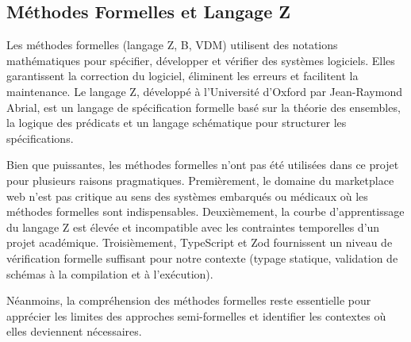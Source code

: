 \subsection{Méthodes Formelles et Langage Z}



Les méthodes formelles (langage Z, B, VDM) utilisent des notations mathématiques pour spécifier, développer et vérifier des systèmes logiciels. Elles garantissent la correction du logiciel, éliminent les erreurs et facilitent la maintenance. Le langage Z, développé à l'Université d'Oxford par Jean-Raymond Abrial, est un langage de spécification formelle basé sur la théorie des ensembles, la logique des prédicats et un langage schématique pour structurer les spécifications.



Bien que puissantes, les méthodes formelles n'ont pas été utilisées dans ce projet pour plusieurs raisons pragmatiques. Premièrement, le domaine du marketplace web n'est pas critique au sens des systèmes embarqués ou médicaux où les méthodes formelles sont indispensables. Deuxièmement, la courbe d'apprentissage du langage Z est élevée et incompatible avec les contraintes temporelles d'un projet académique. Troisièmement, TypeScript et Zod fournissent un niveau de vérification formelle suffisant pour notre contexte (typage statique, validation de schémas à la compilation et à l'exécution).



Néanmoins, la compréhension des méthodes formelles reste essentielle pour apprécier les limites des approches semi-formelles et identifier les contextes où elles deviennent nécessaires.

